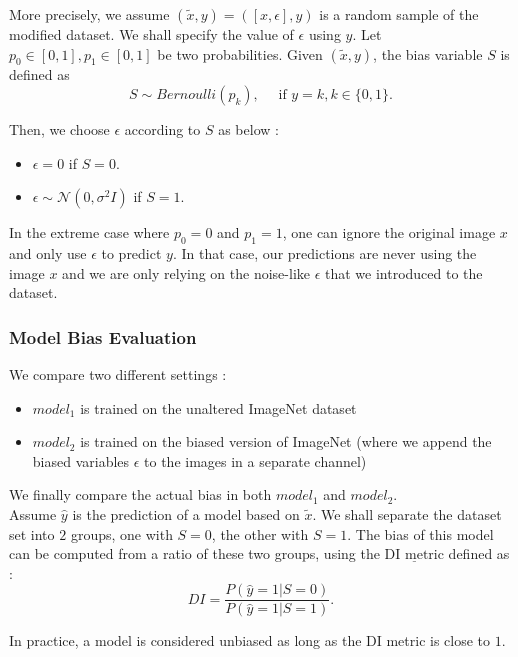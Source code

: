 \documentclass[12pt,a4paper]{article}
\begin{document}
More precisely, we assume $(\tilde{x}, y) = ([x, \epsilon], y)$ is a random sample of the modified dataset.  
We shall specify the value of $\epsilon$ using $y$. Let $p_0 \in [0, 1], p_1 \in [0, 1]$ be two probabilities.  
Given $(\tilde{x}, y)$, the bias variable $S$ is defined as
$$
S \sim Bernoulli(p_k), \quad \text{ if } y = k, k \in \{0, 1\}.
$$

Then, we choose $\epsilon$ according to $S$ as below :
\begin{itemize}[label=--]
    \item $\epsilon = 0$ if $S = 0$.
    \item $\epsilon \sim \mathcal{N}(0, \sigma^2I)$ if $S = 1$.
\end{itemize}

In the extreme case where $p_0 = 0$ and $p_1 = 1$, one can ignore the original image $x$ and only use $\epsilon$ to predict $y$.
In that case, our predictions are never using the image $x$ and we are only relying on the noise-like $\epsilon$ that we introduced to the dataset.


\subsubsection{Model Bias Evaluation}

We compare two different settings :
\begin{itemize}[label=--]
    \item $\textit{model}_1$ is trained on the unaltered ImageNet dataset
    \item $\textit{model}_2$ is trained on the biased version of ImageNet (where we append the biased variables $\epsilon$ to the images in a separate channel)
\end{itemize}


We finally compare the actual bias in both $\textit{model}_1$ and $\textit{model}_2$.\\

Assume $\hat{y}$ is the prediction of a model based on $\tilde{x}$.
We shall separate the dataset set into $2$ groups, one with $S = 0$, the other with $S = 1$.
The bias of this model can be computed from a ratio of these two groups, using the $\underline{\text{DI metric}}$ defined as :
$$
DI = \frac{P(\hat{y} = 1 | S = 0)}{P(\hat{y} = 1 | S = 1)}.
$$

In practice, a model is considered unbiased as long as the DI metric is close to $1$.
\end{document}
